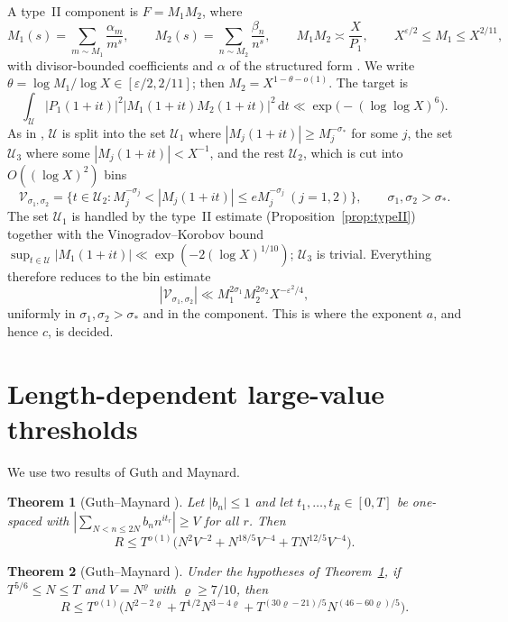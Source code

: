 \documentclass[11pt,a4paper]{amsart}
\newtheorem{theorem}{Theorem}[section]
\theoremstyle{definition}
\newcommand{\e}{\varepsilon}
\newcommand{\dd}{\,\mathrm d}
\newcommand{\1}{\mathbf 1}
\newcommand{\cU}{\mathcal U}
\newcommand{\cV}{\mathcal V}
\begin{document}
A type~II component is \(F=M_1M_2\), where
\[
 M_1(s)=\sum_{m\sim M_1}\frac{\alpha_m}{m^s},\qquad
 M_2(s)=\sum_{n\sim M_2}\frac{\beta_n}{n^s},\qquad
 M_1M_2\asymp\frac{X}{P_1},\qquad X^{\e/2}\le M_1\le X^{2/11},
\]
with divisor-bounded coefficients and \(\alpha\) of the structured form
\cite[(2.11)]{MT}.  We write \(\theta=\log M_1/\log X\in[\e/2,2/11]\);
then \(M_2=X^{1-\theta-o(1)}\).  The target is
\begin{equation}\label{eq:component-target}
 \int_{\cU}|P_1(1+it)|^2|M_1(1+it)M_2(1+it)|^2\dd t
 \ll\exp\bigl(-(\log\log X)^6\bigr).
\end{equation}
As in \cite[Section~5.3]{MT}, \(\cU\) is split into the set \(\cU_1\)
where \(|M_j(1+it)|\ge M_j^{-\sigma_*}\) for some \(j\), the set
\(\cU_3\) where some \(|M_j(1+it)|<X^{-1}\), and the rest \(\cU_2\),
which is cut into \(O((\log X)^2)\) bins
\begin{equation}\label{eq:Vdef}
 \cV_{\sigma_1,\sigma_2}=\bigl\{t\in\cU_2:
 M_j^{-\sigma_j}<|M_j(1+it)|\le eM_j^{-\sigma_j}\ (j=1,2)\bigr\},
 \qquad \sigma_1,\sigma_2>\sigma_* .
\end{equation}
The set \(\cU_1\) is handled by the type~II estimate
(Proposition~\ref{prop:typeII}) together with the Vinogradov--Korobov
bound \cite[(5.6)]{MT}
\(\sup_{t\in\cU}|M_1(1+it)|\ll\exp(-2(\log X)^{1/10})\); \(\cU_3\) is
trivial.  Everything therefore reduces to the bin estimate
\begin{equation}\label{eq:Vtarget}
 |\cV_{\sigma_1,\sigma_2}|\ll M_1^{2\sigma_1}M_2^{2\sigma_2}X^{-\e^2/4},
\end{equation}
uniformly in \(\sigma_1,\sigma_2>\sigma_*\) and in the component.  This
is where the exponent \(a\), and hence \(c\), is decided.

\section{Length-dependent large-value thresholds}\label{sec:largevalues}

We use two results of Guth and Maynard.

\begin{theorem}[{Guth--Maynard \cite[Theorem~1.1]{GM}}]\label{thm:GM}
Let \(|b_n|\le1\) and let \(t_1,\dots,t_R\in[0,T]\) be one-spaced with
\(|\sum_{N<n\le2N}b_nn^{it_r}|\ge V\) for all \(r\).  Then
\[
 R\le T^{o(1)}\bigl(N^2V^{-2}+N^{18/5}V^{-4}+TN^{12/5}V^{-4}\bigr).
\]
\end{theorem}

\begin{theorem}[{Guth--Maynard \cite[Proposition~12.1]{GM}}]
\label{thm:GM-long}
Under the hypotheses of Theorem~\ref{thm:GM}, if
\(T^{5/6}\le N\le T\) and \(V=N^{\varrho}\) with \(\varrho\ge7/10\),
then
\[
 R\le T^{o(1)}\bigl(N^{2-2\varrho}+T^{1/2}N^{3-4\varrho}
 +T^{(30\varrho-21)/5}N^{(46-60\varrho)/5}\bigr).
\]
\end{theorem}
\end{document}
